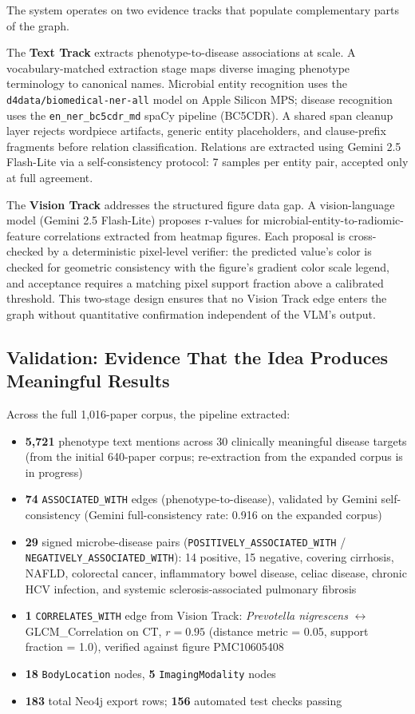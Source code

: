 \documentclass[12pt, letterpaper]{article}
\begin{document}
The system operates on two evidence tracks that populate complementary parts of the graph.

The \textbf{Text Track} extracts phenotype-to-disease associations at scale. A vocabulary-matched extraction stage maps diverse imaging phenotype terminology to canonical names. Microbial entity recognition uses the \texttt{d4data/biomedical-ner-all} model on Apple Silicon MPS; disease recognition uses the \texttt{en\_ner\_bc5cdr\_md} spaCy pipeline (BC5CDR). A shared span cleanup layer rejects wordpiece artifacts, generic entity placeholders, and clause-prefix fragments before relation classification. Relations are extracted using Gemini 2.5 Flash-Lite via a self-consistency protocol: 7 samples per entity pair, accepted only at full agreement.

The \textbf{Vision Track} addresses the structured figure data gap. A vision-language model (Gemini 2.5 Flash-Lite) proposes r-values for microbial-entity-to-radiomic-feature correlations extracted from heatmap figures. Each proposal is cross-checked by a deterministic pixel-level verifier: the predicted value's color is checked for geometric consistency with the figure's gradient color scale legend, and acceptance requires a matching pixel support fraction above a calibrated threshold. This two-stage design ensures that no Vision Track edge enters the graph without quantitative confirmation independent of the VLM's output.

\subsection{Validation: Evidence That the Idea Produces Meaningful Results}

Across the full 1,016-paper corpus, the pipeline extracted:

\begin{itemize}
    \item \textbf{5,721} phenotype text mentions across 30 clinically meaningful disease targets (from the initial 640-paper corpus; re-extraction from the expanded corpus is in progress)
    \item \textbf{74} \texttt{ASSOCIATED\_WITH} edges (phenotype-to-disease), validated by Gemini self-consistency (Gemini full-consistency rate: 0.916 on the expanded corpus)
    \item \textbf{29} signed microbe-disease pairs (\texttt{POSITIVELY\_ASSOCIATED\_WITH} / \texttt{NEGATIVELY\_ASSOCIATED\_WITH}): 14 positive, 15 negative, covering cirrhosis, NAFLD, colorectal cancer, inflammatory bowel disease, celiac disease, chronic HCV infection, and systemic sclerosis-associated pulmonary fibrosis
    \item \textbf{1} \texttt{CORRELATES\_WITH} edge from Vision Track: \textit{Prevotella nigrescens} $\leftrightarrow$ GLCM\_Correlation on CT, $r = 0.95$ (distance metric = 0.05, support fraction = 1.0), verified against figure PMC10605408
    \item \textbf{18} \texttt{BodyLocation} nodes, \textbf{5} \texttt{ImagingModality} nodes
    \item \textbf{183} total Neo4j export rows; \textbf{156} automated test checks passing
\end{itemize}
\end{document}
